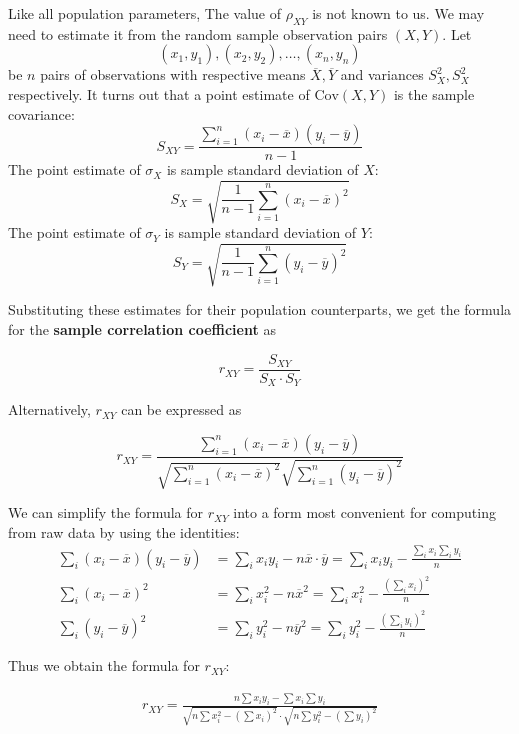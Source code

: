 \documentclass[twoside]{book}
\begin{document}
Like all population parameters, The value of $\rho_{XY}$ is not known to us. We may need to estimate it from the random sample observation pairs $(X,Y)$. Let $$ (x_1, y_1), (x_2, y_2), \dots,(x_n, y_n) $$ be $n$ pairs of observations with respective means $\overline{X}, \overline{Y}$ and variances $S_X^2, S_X^2$ respectively. It turns out that a point estimate of $\text{Cov}(X,Y)$ is the sample covariance:
$$ S_{XY} = \dfrac{\sum_{i=1}^{n} (x_i - \overline{x})(y_i - \overline{y})}{n-1} $$
The point estimate of $\sigma_X$ is sample standard deviation of $X$:
$$S_X = \sqrt{\dfrac{1}{n - 1} \sum_{i=1}^{n} (x_i - \overline{x})^2}$$
The point estimate of $\sigma_Y$ is sample standard deviation of $Y$:
$$S_Y = \sqrt{\dfrac{1}{n - 1} \sum_{i=1}^{n} (y_i - \overline{y})^2}$$

Substituting these estimates for their population counterparts, we get the formula for the \textbf{sample correlation coefficient} as

\begin{textbox}
	\[
	r_{XY} = \dfrac{S_{XY}}{S_X \cdot S_Y}
	\]
\end{textbox}
Alternatively, $r_{XY}$ can be expressed as
\begin{textbox}
\[
r_{XY} = \dfrac{\sum_{i=1}^{n} (x_i - \overline{x})(y_i - \overline{y})}{\sqrt{\sum_{i=1}^{n} (x_i - \overline{x})^2} \sqrt{\sum_{i=1}^{n} (y_i - \overline{y})^2}}
\]
\end{textbox}

We can simplify the formula for $r_{XY}$ into a form most convenient for computing from raw data by using the identities:
\begin{align*}
\sum_i (x_i - \overline{x})(y_i - \overline{y}) &= \sum_i x_i y_i - n\overline{x}\cdot \overline{y} = \sum_i x_i y_i - \frac{\sum_i x_i \sum_i y_i}{n} \\
\sum_i (x_i - \overline{x})^2 &= \sum_i x_i^2 -n\overline{x}^2= \sum_i x_i^2 - \frac{(\sum_i x_i)^2}{n} \\
\sum_i (y_i - \overline{y})^2 &= \sum_i y_i^2 -n\overline{y}^2= \sum_i y_i^2 - \frac{(\sum_i y_i)^2}{n}
\end{align*}

Thus we obtain the formula for $r_{XY}$:
\begin{textbox}
\begin{align*}
r_{XY} = \frac{n \sum x_i y_i - \sum x_i \sum y_i}
{\sqrt{n \sum x_i^2 - (\sum x_i)^2} \cdot \sqrt{n \sum y_i^2 - (\sum y_i)^2}}
\end{align*}
\end{textbox}
\end{document}
